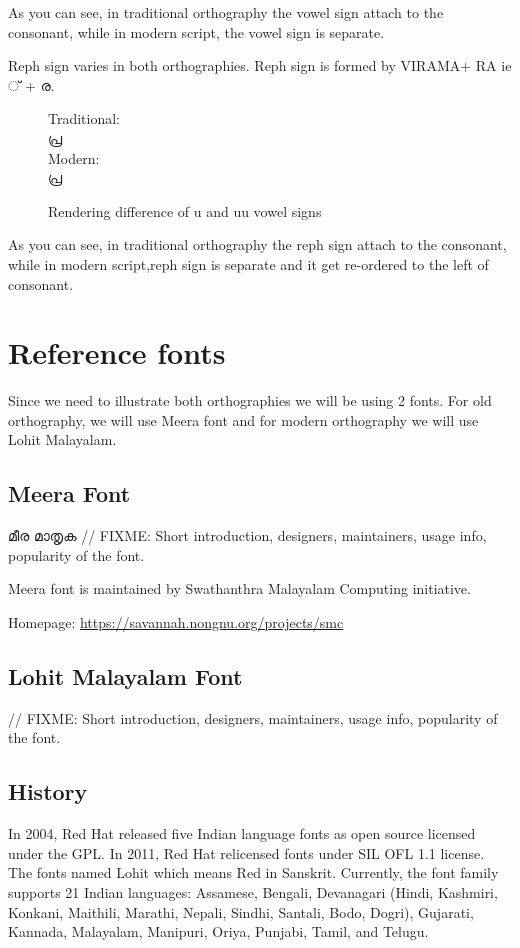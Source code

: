 As you can see, in traditional orthography the vowel sign attach to the 
consonant, while in modern script, the vowel sign is separate.

Reph sign varies in both orthographies. Reph sign is formed by VIRAMA+ RA ie 
{\malayalam ് + ര}.
\begin{figure}[h]
Traditional:\\ {\meera\textexample  പ്ര }\\
Modern: \\ {\lohitmalayalam\textexample  പ്ര }
   \caption{Rendering difference of u and uu vowel signs}
\end{figure}

As you can see, in traditional orthography the reph sign attach to the 
consonant, while in modern script,reph sign is separate and it get re-ordered 
to the left of consonant.


\section{Reference fonts}

Since we need to illustrate both orthographies we will be using 2
fonts. For old orthography, we will use Meera font and for modern
orthography we will use Lohit Malayalam.

\subsection {Meera Font}
{\meera മീര മാതൃക }
// FIXME: Short introduction, designers, maintainers, usage info, popularity of 
the font.

Meera font is maintained by Swathanthra Malayalam Computing initiative.

Homepage: {\url{https://savannah.nongnu.org/projects/smc}}

\subsection {Lohit Malayalam Font}
// FIXME: Short introduction, designers, maintainers, usage info, popularity of 
the font.

\subsection {History}
In 2004, Red Hat released five Indian language fonts as open source licensed
under the GPL. In 2011, Red Hat relicensed fonts under SIL OFL 1.1 license.
The fonts named Lohit which means Red in Sanskrit. Currently, the font family
supports 21 Indian languages: Assamese, Bengali, Devanagari (Hindi, Kashmiri,
Konkani, Maithili, Marathi, Nepali, Sindhi, Santali, Bodo, Dogri), Gujarati,
Kannada, Malayalam, Manipuri, Oriya, Punjabi, Tamil, and Telugu.

